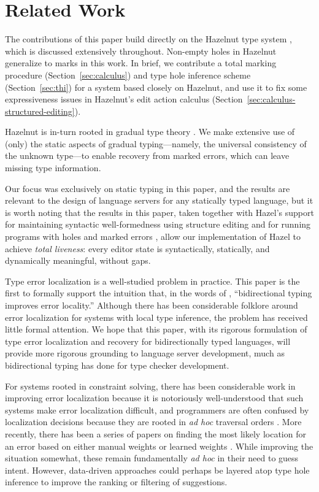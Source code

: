 \section{Related Work}
\label{sec:related}

The contributions of this paper build directly on the Hazelnut type system \cite{omar2017b}, which is discussed extensively throughout. Non-empty holes in Hazelnut generalize to marks in this work. In brief, we contribute a total marking procedure (Section~\ref{sec:calculus}) and type hole inference scheme (Section~\ref{sec:thi}) for a system based closely on Hazelnut, and use it to fix some expressiveness issues in Hazelnut's edit action calculus (Section~\ref{sec:calculus-structured-editing}). 

Hazelnut is in-turn rooted in gradual type theory \cite{siek2006, siek2015}. We make extensive use of (only) the static aspects of gradual typing---namely, the universal consistency of the unknown type---to enable recovery from marked errors, which can leave missing type information.

Our focus was exclusively on static typing in this paper, and the results are relevant to the design of language servers for any statically typed language, but it is worth noting that the results in this paper, taken together with Hazel's support for maintaining syntactic well-formedness using structure editing \cite{moon2023,moon2022} and for running programs with holes and marked errors \cite{omar2019}, allow our implementation of Hazel to achieve \emph{total liveness}: every editor state is syntactically, statically, and dynamically meaningful, without gaps.

Type error localization is a well-studied problem in practice. This paper is the first to formally support the intuition that, in the words of \citet{dunfield2019}, ``bidirectional typing improves error locality.'' Although there has been considerable folklore around error localization 
for systems with local type inference, the problem has received little formal attention. We hope that this paper, with its rigorous formulation
of type error localization and recovery for bidirectionally typed languages, will provide more rigorous grounding to language server development,
much as bidirectional typing has done for type checker development.

For systems rooted in constraint solving, there has been considerable work in improving error localization because it is notoriously well-understood that such systems make error localization difficult, and programmers are often confused by localization decisions \cite{wand1986} because they are rooted in \emph{ad hoc} traversal orders \cite{mcadam1999,lee1998}. More recently, there has been a series of papers on finding the most likely location for an error based on either manual weights \cite{zhang2014,pavlinovic2014} or learned weights \cite{seidel2017}.
While improving the situation somewhat, these remain fundamentally \emph{ad hoc} in their need to guess intent. However, data-driven approaches could perhaps be layered atop type hole inference to improve the ranking or filtering of suggestions.

